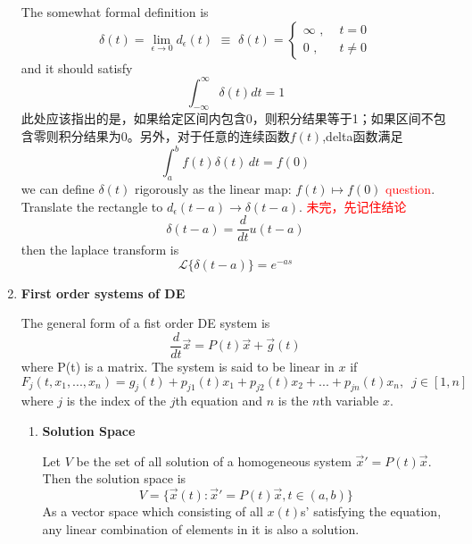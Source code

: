 \documentclass[9pt]{article}
\theoremstyle{definition}
\newenvironment{changemargin}[2]{%
  \begin{list}{}{%
    \setlength{\topsep}{0pt}%
    \setlength{\leftmargin}{#1}%
    \setlength{\rightmargin}{#2}%
    \setlength{\listparindent}{\parindent}%
    \setlength{\itemindent}{\parindent}%
    \setlength{\parsep}{\parskip}%
  }%
  \item[]}{\end{list}}
\theoremstyle{theorem}
\theoremstyle{remark}
\theoremstyle{lemma}
\begin{document}
\begin{changemargin}{-0.125in}{0in}
\begin{enumerate}
        The somewhat formal definition is  
        \[
        \delta(t) = \lim_{\epsilon \rightarrow 0} d_\epsilon (t) \,\, \equiv \,\, \delta(t) = \left\{
                    \begin{aligned}
                        \infty \,\,, & \,\, t = 0 \\
                        0 \,\,, \,\, & \,\, t \neq 0
                    \end{aligned}
                    \right.
        \]
        and it should satisfy 
        \[
        \int^\infty_{-\infty}\delta(t) dt = 1
        \]
        此处应该指出的是，如果给定区间内包含0，则积分结果等于1；如果区间不包含零则积分结果为0。另外，对于任意的连续函数$f(t)$,delta函数满足
        \[
        \int^b_a f(t)\delta(t)\,dt = f(0)
        \]
        we can define $\delta(t)$ rigorously as the linear map: $f(t) \mapsto f(0)$ \textcolor{red}{question}. Translate the rectangle to $d_\epsilon(t-a) \rightarrow \delta(t-a)$. \textcolor{red}{未完，先记住结论}
        \[
        \delta(t -a) = \frac{d}{dt} u(t-a)
        \]
        then the laplace transform is 
        \[
        \mathcal{L}\{\delta(t-a)\} = e^{-as}
        \]
        
        \medskip
        
        \item \textbf{First order systems of DE}
        
        \smallskip
        
        The general form of a fist order DE system is 
        \[
        \frac{d}{dt} \overrightarrow{x} = P(t)\overrightarrow{x} + \overrightarrow{g}(t)
        \]
        where P(t) is a matrix. The system is said to be linear in $x$ if 
        \[
        F_j(t,x_1,...,x_n) = g_j(t) + p_{j1}(t)x_1 + p_{j2}(t)x_2+...+p_{jn}(t)x_n,\,\,\,j\in[1,n]
        \]
        where $j$ is the index of the $j$th equation and $n$ is the $n$th variable $x$.
        
        \begin{enumerate}
        
        \item \textbf{Solution Space}
        
        \smallskip
        
        Let $V$ be the set of all solution of a homogeneous system $\overrightarrow{x}' = P(t)\overrightarrow{x}$. Then the solution space is 
        \[
        V = \{
             \overrightarrow{x}(t) :  \overrightarrow{x}' = P(t)\overrightarrow{x}, t \in (a,b)
            \}
        \]
        As a vector space which consisting of all $x(t)$s' satisfying the equation, any linear combination of elements in it is also a solution. 
        

\end{enumerate}
\end{enumerate}
\end{changemargin}
\end{document}
